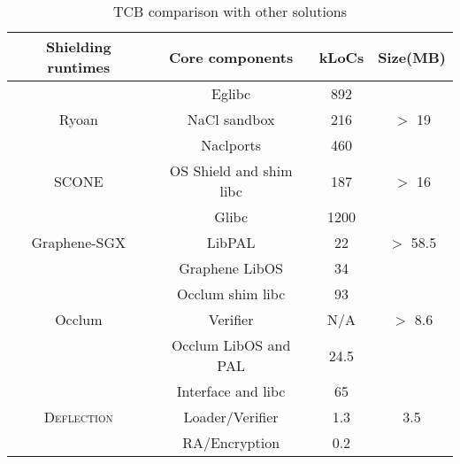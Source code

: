 
\begin{table}[htbp]
\footnotesize
\caption{TCB comparison with other solutions}\label{tb-tcb}
\vspace{-8pt}
\begin{center}
\begin{tabular}{|c|c|c|c|}
\hline
\textbf{Shielding runtimes} & \textbf{Core components} & kLoCs & \textbf{Size(MB)} \\
\hline
 & Eglibc & 892 & \\
Ryoan & NaCl sandbox & 216 & $>$ 19 \\
 & Naclports & 460 & \\
\hline
SCONE & OS Shield and shim libc & 187 & $>$ 16 \\
\hline
 & Glibc & 1200 & \\
Graphene-SGX & LibPAL & 22 & $>$ 58.5 \\
 & Graphene LibOS & 34 & \\
\hline
 & Occlum shim libc & 93 & \\
Occlum & Verifier & N/A & $>$ 8.6 \\
 & Occlum LibOS and PAL & 24.5 & \\
\hline
 & Interface and libc & 65  & \\
\textsc{Deflection} & Loader/Verifier & 1.3 & 3.5 \\ 
 & RA/Encryption & 0.2 & \\
\hline
\end{tabular}
\end{center}
\vspace{-10pt}
\end{table}







